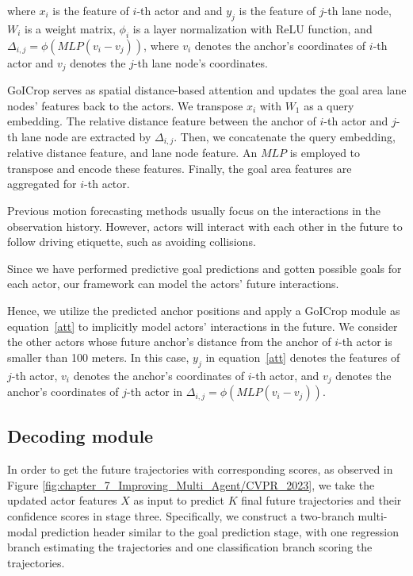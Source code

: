 where $x_i$ is the feature of $i$-th actor and and $y_j$ is the feature of $j$-th lane node, $W_i$ is a weight matrix, $\phi_i$ is a layer normalization with ReLU function, and $\Delta_{i,j}=\phi(MLP(v_i-v_j))$, where $v_i$ denotes the anchor's coordinates of $i$-th actor and $v_j$ denotes the $j$-th lane node's coordinates.
 
GoICrop serves as spatial distance-based attention and updates the goal area lane nodes' features back to the actors. We transpose $x_i$ with $W_1$ as a query embedding. The relative distance feature between the anchor of $i$-th actor and $j$-th lane node are extracted by $\Delta_{i,j}$. Then, we concatenate the query embedding, relative distance feature, and lane node feature. An $MLP$ is employed to transpose and encode these features. Finally, the goal area features are aggregated for $i$-th actor.

Previous motion forecasting methods usually focus on the interactions in the observation history. 
However, actors will interact with each other in the future to follow driving etiquette, such as avoiding collisions. 

Since we have performed predictive goal predictions and gotten possible goals for each actor, our framework can model the actors' future interactions.

Hence, we utilize the predicted anchor positions and apply a GoICrop module as equation~\ref{att} to implicitly model actors' interactions in the future. We consider the other actors whose future anchor's distance from the anchor of $i$-th actor is smaller than 100 meters. In this case, $y_j$ in equation~\ref{att} denotes the features of $j$-th actor, $v_i$ denotes the anchor's coordinates of $i$-th actor, and $v_j$ denotes the anchor's coordinates of $j$-th actor in $\Delta_{i,j}=\phi(MLP(v_i-v_j))$.

\subsection{Decoding module}

In order to get the future trajectories with corresponding scores, as observed in Figure \ref{fig:chapter_7_Improving_Multi_Agent/CVPR_2023}, we take the updated actor features $X$ as input to predict $K$ final future trajectories and their confidence scores in stage three. 
Specifically, we construct a two-branch multi-modal prediction header similar to the goal prediction stage, with one regression branch estimating the trajectories and one classification branch scoring the trajectories.

